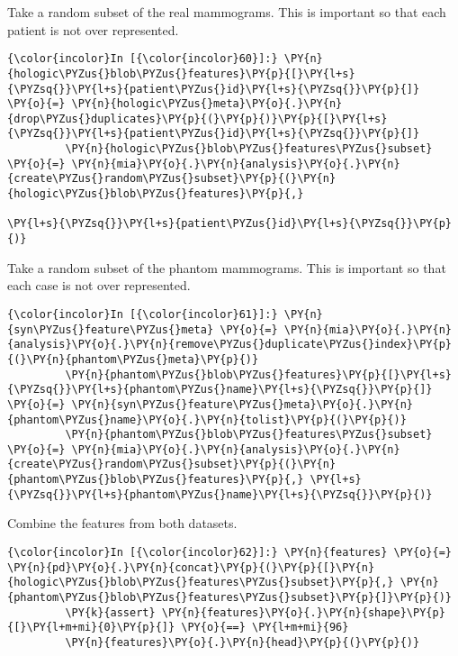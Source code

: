     Take a random subset of the real mammograms. This is important so that
each patient is not over represented.

    \begin{Verbatim}[commandchars=\\\{\}]
{\color{incolor}In [{\color{incolor}60}]:} \PY{n}{hologic\PYZus{}blob\PYZus{}features}\PY{p}{[}\PY{l+s}{\PYZsq{}}\PY{l+s}{patient\PYZus{}id}\PY{l+s}{\PYZsq{}}\PY{p}{]} \PY{o}{=} \PY{n}{hologic\PYZus{}meta}\PY{o}{.}\PY{n}{drop\PYZus{}duplicates}\PY{p}{(}\PY{p}{)}\PY{p}{[}\PY{l+s}{\PYZsq{}}\PY{l+s}{patient\PYZus{}id}\PY{l+s}{\PYZsq{}}\PY{p}{]}
         \PY{n}{hologic\PYZus{}blob\PYZus{}features\PYZus{}subset} \PY{o}{=} \PY{n}{mia}\PY{o}{.}\PY{n}{analysis}\PY{o}{.}\PY{n}{create\PYZus{}random\PYZus{}subset}\PY{p}{(}\PY{n}{hologic\PYZus{}blob\PYZus{}features}\PY{p}{,}
                                                                          \PY{l+s}{\PYZsq{}}\PY{l+s}{patient\PYZus{}id}\PY{l+s}{\PYZsq{}}\PY{p}{)}
\end{Verbatim}

    Take a random subset of the phantom mammograms. This is important so
that each case is not over represented.

    \begin{Verbatim}[commandchars=\\\{\}]
{\color{incolor}In [{\color{incolor}61}]:} \PY{n}{syn\PYZus{}feature\PYZus{}meta} \PY{o}{=} \PY{n}{mia}\PY{o}{.}\PY{n}{analysis}\PY{o}{.}\PY{n}{remove\PYZus{}duplicate\PYZus{}index}\PY{p}{(}\PY{n}{phantom\PYZus{}meta}\PY{p}{)}
         \PY{n}{phantom\PYZus{}blob\PYZus{}features}\PY{p}{[}\PY{l+s}{\PYZsq{}}\PY{l+s}{phantom\PYZus{}name}\PY{l+s}{\PYZsq{}}\PY{p}{]} \PY{o}{=} \PY{n}{syn\PYZus{}feature\PYZus{}meta}\PY{o}{.}\PY{n}{phantom\PYZus{}name}\PY{o}{.}\PY{n}{tolist}\PY{p}{(}\PY{p}{)}
         \PY{n}{phantom\PYZus{}blob\PYZus{}features\PYZus{}subset} \PY{o}{=} \PY{n}{mia}\PY{o}{.}\PY{n}{analysis}\PY{o}{.}\PY{n}{create\PYZus{}random\PYZus{}subset}\PY{p}{(}\PY{n}{phantom\PYZus{}blob\PYZus{}features}\PY{p}{,} \PY{l+s}{\PYZsq{}}\PY{l+s}{phantom\PYZus{}name}\PY{l+s}{\PYZsq{}}\PY{p}{)}
\end{Verbatim}

    Combine the features from both datasets.

    \begin{Verbatim}[commandchars=\\\{\}]
{\color{incolor}In [{\color{incolor}62}]:} \PY{n}{features} \PY{o}{=} \PY{n}{pd}\PY{o}{.}\PY{n}{concat}\PY{p}{(}\PY{p}{[}\PY{n}{hologic\PYZus{}blob\PYZus{}features\PYZus{}subset}\PY{p}{,} \PY{n}{phantom\PYZus{}blob\PYZus{}features\PYZus{}subset}\PY{p}{]}\PY{p}{)}
         \PY{k}{assert} \PY{n}{features}\PY{o}{.}\PY{n}{shape}\PY{p}{[}\PY{l+m+mi}{0}\PY{p}{]} \PY{o}{==} \PY{l+m+mi}{96}
         \PY{n}{features}\PY{o}{.}\PY{n}{head}\PY{p}{(}\PY{p}{)}
\end{Verbatim}

